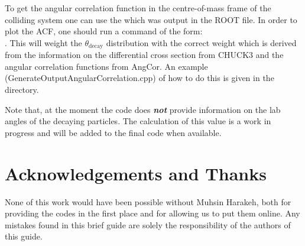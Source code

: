 \documentclass[a4paper,10pt]{article}
\begin{document}
To get the angular correlation function in the centre-of-mass frame of the colliding system one can use the  which was output in the ROOT file. In order to plot the ACF, one should run a command of the form:\\ . This will weight the $\theta_{\mathrm{decay}}$ distribution with the correct weight which is derived from the information on the differential cross section from CHUCK3 and the angular correlation functions from AngCor. An example (GenerateOutputAngularCorrelation.cpp) of how to do this is given in the  directory.

Note that, at the moment the code does {\it \bf not} provide information on the lab angles of the decaying particles. The calculation of this value is a work in progress and will be added to the final code when available.

\section{Acknowledgements and Thanks}

None of this work would have been possible without Muhsin Harakeh, both for providing the codes in the first place and for allowing us to put them online. Any mistakes found in this brief guide are solely the responsibility of the authors of this guide.
\end{document}
